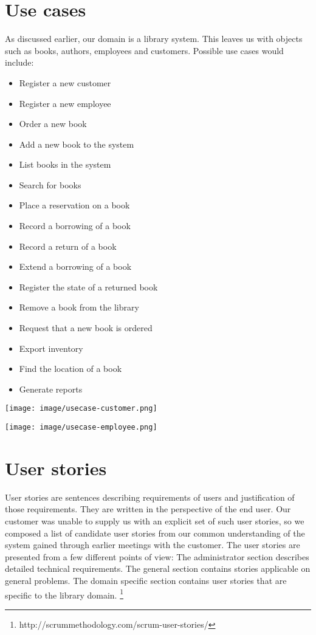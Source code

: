 \section{Use cases}
As discussed earlier, our domain is a library system. This leaves us with objects such as books, authors, employees and customers. Possible use cases would include:
\begin{itemize}
  \item Register a new customer
  \item Register a new employee
  \item Order a new book
  \item Add a new book to the system
  \item List books in the system
  \item Search for books
  \item Place a reservation on a book
  \item Record a borrowing of a book
  \item Record a return of a book
  \item Extend a borrowing of a book
  \item Register the state of a returned book
  \item Remove a book from the library
  \item Request that a new book is ordered
  \item Export inventory
  \item Find the location of a book
  \item Generate reports
\end{itemize}

\begin{center}
\texttt{[image: image/usecase-customer.png]}
\label{usecase-customer}%
\end{center}

\begin{center}
\texttt{[image: image/usecase-employee.png]}
\label{usecase-employee}%
\end{center}



\section{User stories}
User stories are sentences describing requirements of users and justification of those requirements. They are written in the perspective of the end user. Our customer was unable to supply us with an explicit set of such user stories, so we composed a list of candidate user stories from our common understanding of the system gained through earlier meetings with the customer. The user stories are presented from a few different points of view: The administrator section describes detailed technical requirements. The general section contains stories applicable on general problems. The domain specific section contains user stories that are specific to the library domain. \footnote{http://scrummethodology.com/scrum-user-stories/}

